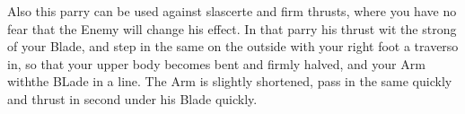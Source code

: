 
Also this parry can be used against slascerte and firm thrusts, where you have no fear that the
Enemy will change his effect. In that parry his thrust wit the strong
of your Blade, and step in the same on the outside with your right
foot a traverso in, so that your upper body becomes bent and firmly
halved, and your Arm withthe BLade in a line. The Arm is slightly
shortened, pass in the same quickly and thrust in second under his
Blade quickly.



